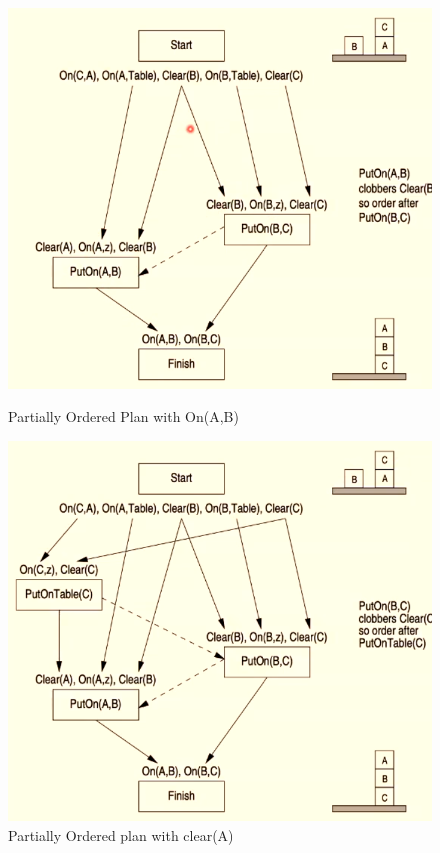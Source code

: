 \documentclass[a4paper]{article}
\theoremstyle{plain}
\theoremstyle{definition}
\theoremstyle{remark}
\begin{document}
\begin{figure}[H]
   \begin{minipage}{0.48\textwidth}
     \centering
     \includegraphics[width=.9\linewidth]{f3.png}
     \caption{Partially Ordered Plan with On(A,B)}\label{Fig:4Data1}
   \end{minipage}\hfill
   \begin{minipage}{0.48\textwidth}
     \centering
     \includegraphics[width=.9\linewidth]{f4.png}
     \caption{Partially Ordered plan with clear(A)}\label{Fig:Data2}
   \end{minipage}
\end{figure}
\end{document}
